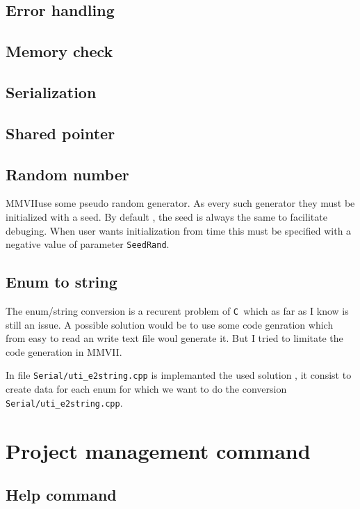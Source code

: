 \documentclass[a4paper]{book}
\newcommand{\CPP}{\mbox{\tt C\hspace{-0.05cm}\raisebox{0.2ex}{\small ++} }}
\newcommand{\PPP}{MMVII}
\begin{document}
{\section{Error handling}
\section{Memory check}
\section{Serialization}
\section{Shared pointer}

\section{Random number}

\PPP use some pseudo random generator. As every such generator
they must be initialized with a seed.
By default , the seed is always the same to facilitate debuging.
When user wants initialization from time this must be specified 
with a negative value of parameter {\tt  SeedRand}.



\section{Enum to string}

The enum/string  conversion is a recurent problem of \CPP which
as far as I know is still an issue. A possible solution
would be to use some code genration which from easy to read
an write text file woul generate it. But I tried to limitate
the code generation in \PPP.

In file {\tt Serial/uti\_e2string.cpp} is implemanted 
the used solution , it consist  to create data for each enum
for which we want to do the conversion {\tt Serial/uti\_e2string.cpp}.





\chapter{Project management command}

\section{Help command}

}
\end{document}
